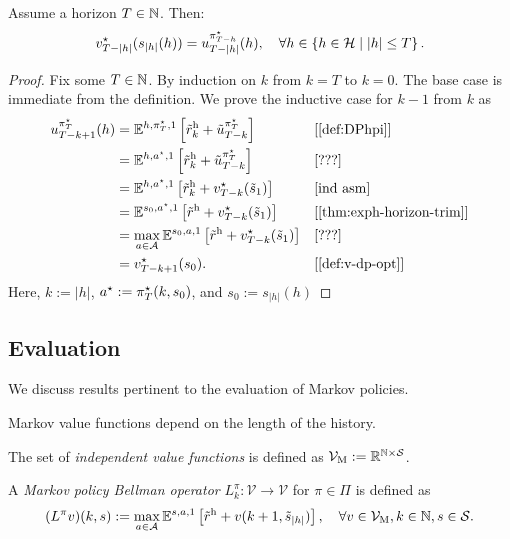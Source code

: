 \begin{theorem}
Assume a horizon $T\in \mathbb{N}$. Then:
\[
  v^{\star}_{T-|h|}(s_{|h|}(h)) = u^{\pi^{\star}_{T-h}}_{T-|h|}(h), \quad
  \forall h\in \left\{ h\in \mathcal{H} \mid |h| \le T \right\}.
\]
\end{theorem}
\begin{proof}
Fix some $T \in \mathbb{N}$. By induction on $k$ from $k = T$ to $k=0$. The base case is immediate from the definition. We prove the inductive case for $k-1$ from $k$ as
\begin{align*}
u^{\pi\opt_T}_{T-k + 1}(h)
  &=  \E^{h, \pi\opt_T, 1} \left[ \rew_k + \tilde{u}^{\pi\opt_T}_{T-k} \right]
  && \why{\cref{def:DPhpi}} \\
  &=  \E^{h, a\opt, 1} \left[ \rew_k + \tilde{u}^{\pi\opt_T}_{T-k} \right]
  && \why{???} \\
  &=  \E^{h, a\opt, 1} \left[ \rew_{k} + v_{T-k}\opt(\tilde{s}_1) \right]
  && \why{ind asm} \\
  &=  \E^{s_0, a\opt, 1} \left[ \rew +  v_{T-k}\opt(\tilde{s}_1) \right]
  && \why{\cref{thm:exph-horizon-trim}} \\
  &=  \max_{a\in \mathcal{A}} \E^{s_0, a, 1} \left[ \rew +  v_{T-k}\opt(\tilde{s}_1) \right]
  && \why{???} \\
  &=  v_{T-k+1}\opt(s_0). && \why{\cref{def:v-dp-opt}}
\end{align*}
Here, $k := |h|$, $a^{\star} := \pi^{\star}_T(k, s_0)$, and $s_0 := s_{|h|}(h)$
\end{proof}

\subsection{Evaluation}
We discuss results pertinent to the evaluation of Markov policies. 

Markov value functions depend on the length of the history.
\begin{definition} \label{def:ValuesM}
  The set of \emph{independent value functions} is defined as $\mathcal{V}_{\mathrm{M}} := \mathbb{R}^{\mathbb{N} \times \mathcal{S}}$.
  \leanok
\end{definition}


\begin{definition}\label{def:DPMopt}
A \emph{Markov policy Bellman operator} $L_k^{\pi}\colon \mathcal{V} \to \mathcal{V}$ for $\pi\in \Pi$ is defined as
\[
(L^{\pi} v)(k, s)  :=
\max_{a\in \mathcal{A}} \mathbb{E}^{s, a, 1} \left[ \tilde{r}^{\mathrm{h}} + v(k + 1, \tilde{s}_{|h|}) \right], \quad \forall v\in \mathcal{V}_{\mathrm{M}}, k\in \mathbb{N}, s\in \mathcal{S}.
\]
\leanok
\end{definition}


